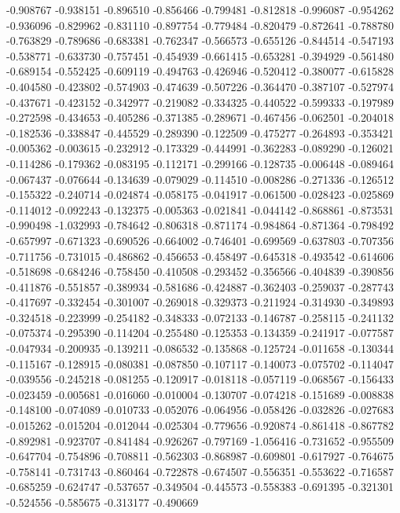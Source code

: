 -0.908767
-0.938151
-0.896510
-0.856466
-0.799481
-0.812818
-0.996087
-0.954262
-0.936096
-0.829962
-0.831110
-0.897754
-0.779484
-0.820479
-0.872641
-0.788780
-0.763829
-0.789686
-0.683381
-0.762347
-0.566573
-0.655126
-0.844514
-0.547193
-0.538771
-0.633730
-0.757451
-0.454939
-0.661415
-0.653281
-0.394929
-0.561480
-0.689154
-0.552425
-0.609119
-0.494763
-0.426946
-0.520412
-0.380077
-0.615828
-0.404580
-0.423802
-0.574903
-0.474639
-0.507226
-0.364470
-0.387107
-0.527974
-0.437671
-0.423152
-0.342977
-0.219082
-0.334325
-0.440522
-0.599333
-0.197989
-0.272598
-0.434653
-0.405286
-0.371385
-0.289671
-0.467456
-0.062501
-0.204018
-0.182536
-0.338847
-0.445529
-0.289390
-0.122509
-0.475277
-0.264893
-0.353421
-0.005362
-0.003615
-0.232912
-0.173329
-0.444991
-0.362283
-0.089290
-0.126021
-0.114286
-0.179362
-0.083195
-0.112171
-0.299166
-0.128735
-0.006448
-0.089464
-0.067437
-0.076644
-0.134639
-0.079029
-0.114510
-0.008286
-0.271336
-0.126512
-0.155322
-0.240714
-0.024874
-0.058175
-0.041917
-0.061500
-0.028423
-0.025869
-0.114012
-0.092243
-0.132375
-0.005363
-0.021841
-0.044142
-0.868861
-0.873531
-0.990498
-1.032993
-0.784642
-0.806318
-0.871174
-0.984864
-0.871364
-0.798492
-0.657997
-0.671323
-0.690526
-0.664002
-0.746401
-0.699569
-0.637803
-0.707356
-0.711756
-0.731015
-0.486862
-0.456653
-0.458497
-0.645318
-0.493542
-0.614606
-0.518698
-0.684246
-0.758450
-0.410508
-0.293452
-0.356566
-0.404839
-0.390856
-0.411876
-0.551857
-0.389934
-0.581686
-0.424887
-0.362403
-0.259037
-0.287743
-0.417697
-0.332454
-0.301007
-0.269018
-0.329373
-0.211924
-0.314930
-0.349893
-0.324518
-0.223999
-0.254182
-0.348333
-0.072133
-0.146787
-0.258115
-0.241132
-0.075374
-0.295390
-0.114204
-0.255480
-0.125353
-0.134359
-0.241917
-0.077587
-0.047934
-0.200935
-0.139211
-0.086532
-0.135868
-0.125724
-0.011658
-0.130344
-0.115167
-0.128915
-0.080381
-0.087850
-0.107117
-0.140073
-0.075702
-0.114047
-0.039556
-0.245218
-0.081255
-0.120917
-0.018118
-0.057119
-0.068567
-0.156433
-0.023459
-0.005681
-0.016060
-0.010004
-0.130707
-0.074218
-0.151689
-0.008838
-0.148100
-0.074089
-0.010733
-0.052076
-0.064956
-0.058426
-0.032826
-0.027683
-0.015262
-0.015204
-0.012044
-0.025304
-0.779656
-0.920874
-0.861418
-0.867782
-0.892981
-0.923707
-0.841484
-0.926267
-0.797169
-1.056416
-0.731652
-0.955509
-0.647704
-0.754896
-0.708811
-0.562303
-0.868987
-0.609801
-0.617927
-0.764675
-0.758141
-0.731743
-0.860464
-0.722878
-0.674507
-0.556351
-0.553622
-0.716587
-0.685259
-0.624747
-0.537657
-0.349504
-0.445573
-0.558383
-0.691395
-0.321301
-0.524556
-0.585675
-0.313177
-0.490669
